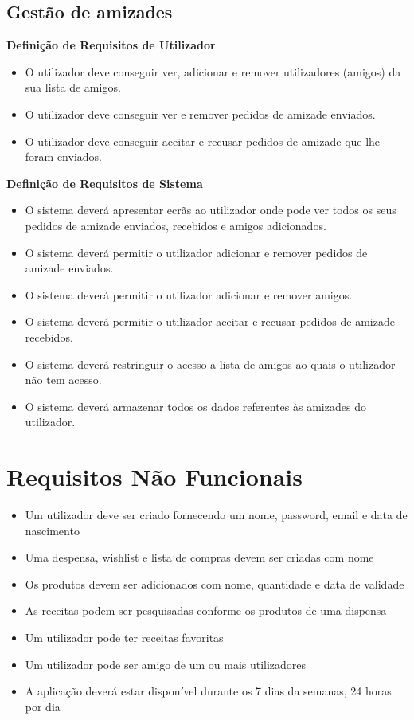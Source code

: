 \documentclass[a4paper]{report}
\begin{document}
        \subsection{Gestão de amizades}
            \textbf{Definição de Requisitos de Utilizador}
            \begin{itemize}
                \item O utilizador deve conseguir ver, adicionar e remover
                utilizadores (amigos) da sua lista de amigos.
                \item O utilizador deve conseguir ver e remover pedidos 
                de amizade enviados.
                \item O utilizador deve conseguir aceitar e recusar pedidos 
                de amizade que lhe foram enviados.
            \end{itemize}
            \textbf{Definição de Requisitos de Sistema}
            \begin{itemize}
                \item O sistema deverá apresentar ecrãs ao utilizador onde
                pode ver todos os seus pedidos de amizade enviados, recebidos
                e amigos adicionados.
                \item O sistema deverá permitir o utilizador adicionar e 
                remover pedidos de amizade enviados.
                \item O sistema deverá permitir o utilizador adicionar e 
                remover amigos.
                \item O sistema deverá permitir o utilizador aceitar e 
                recusar pedidos de amizade recebidos.
                \item O sistema deverá restringuir o acesso a lista de amigos
                ao quais o utilizador não tem acesso.
                \item O sistema deverá armazenar todos os dados referentes às
                amizades do utilizador.
            \end{itemize}

    \section{Requisitos Não Funcionais}
    \begin{itemize}
        \item Um utilizador deve ser criado fornecendo um nome, password, email e data de nascimento
        \item Uma despensa, wishlist e lista de compras devem ser criadas com nome
        \item Os produtos devem ser adicionados com nome, quantidade e data de validade
        \item As receitas podem ser pesquisadas conforme os produtos de uma dispensa
        \item Um utilizador pode ter receitas favoritas
        \item Um utilizador pode ser amigo de um ou mais utilizadores
        \item A aplicação deverá estar disponível durante os 7 dias da semanas, 24 horas por dia
    \end{itemize}
\end{document}
